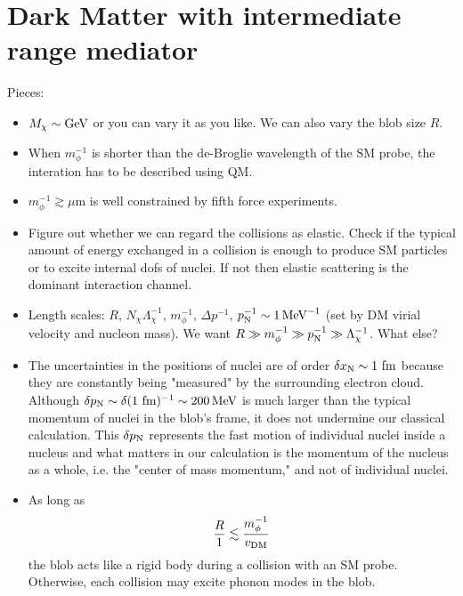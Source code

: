 \documentclass[%
 reprint,
 amsmath,amssymb,
 aps,nofootinbib
]{revtex4-1}
\newcommand{\MeV}{\mathinner{\mathrm{MeV}}}
\newcommand{\GeV}{\mathinner{\mathrm{GeV}}}
\begin{document}
\section{Dark Matter with intermediate range mediator}
Pieces:
\begin{itemize}
    \item $M_\chi\sim \GeV$ or you can vary it as you like. We can also vary the blob size $R$.
    \item When $m_\phi^{-1}$ is shorter than the de-Broglie wavelength of the SM probe, the interation has to be described using QM.
    \item $m_\phi^{-1}\gtrsim \mu\text{m}$ is well constrained by fifth force experiments.
    \item Figure out whether we can regard the collisions as elastic. Check if the typical amount of energy exchanged in a collision is enough to produce SM particles or to excite internal dofs of nuclei. If not then elastic scattering is the dominant interaction channel.
    \item Length scales: $R$, $N_\chi \Lambda_\chi^{-1}$, $m_\phi^{-1}$, $\Delta p^{-1}$, $p_{\rm N}^{-1}\sim 1 \MeV^{-1}$ (set by DM virial velocity and nucleon mass). We want $R\gg m_\phi^{-1}\gg p_{\rm N}^{-1}\gg \Lambda_\chi^{-1}$. What else?
    \item The uncertainties in the positions of nuclei are of order $\delta x_{\rm N}\sim 1 \text{ fm}$ because they are constantly being "measured" by the surrounding electron cloud. Although $\delta p_{\rm N}\sim \delta (1\text{ fm})^{-1}\sim 200 \MeV$ is much larger than the typical momentum of nuclei in the blob's frame, it does not undermine our classical calculation. This $\delta p_{\rm N}$ represents the fast motion of individual nuclei inside a nucleus and what matters in our calculation is the momentum of the nucleus as a whole, i.e. the "center of mass momentum," and not of individual nuclei.
    \item As long as
    \begin{equation}
        \frac{R}{1}\lesssim \frac{m_\phi^{-1}}{v_{\rm DM}}
    \end{equation}
    the blob acts like a rigid body during a collision with an SM probe. Otherwise, each collision may excite phonon modes in the blob.
\end{itemize}
\end{document}
